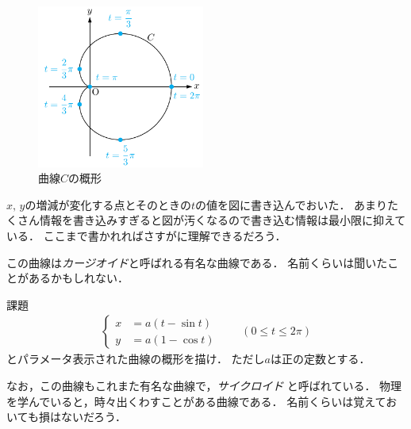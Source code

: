\begin{figure}[h]
 \centering
 \includegraphics[width=5.5cm]{picture/henbibun3.pdf}
 \caption{曲線$C$の概形}
 \label{fig:cardioid}
\end{figure}

$x, \, y$の増減が変化する点とそのときの$t$の値を図に書き込んでおいた．
あまりたくさん情報を書き込みすぎると図が汚くなるので書き込む情報は最小限に抑えている．
ここまで書かれればさすがに理解できるだろう．

この曲線は\emph{カージオイド}と呼ばれる有名な曲線である．
名前くらいは聞いたことがあるかもしれない．
\begin{itembox}[l]{課題}
\begin{align*}
\left\{
\begin{aligned}
x & = a ( t - \sin t) \\
y & = a ( 1 - \cos t )
\end{aligned}
\right.
\qquad (0 \leq t \leq 2 \pi)
\end{align*}
とパラメータ表示された曲線の概形を描け．
ただし$a$は正の定数とする．
 \end{itembox}
なお，この曲線もこれまた有名な曲線で，\emph{サイクロイド}
と呼ばれている．
物理を学んでいると，時々出くわすことがある曲線である．
名前くらいは覚えておいても損はないだろう．
